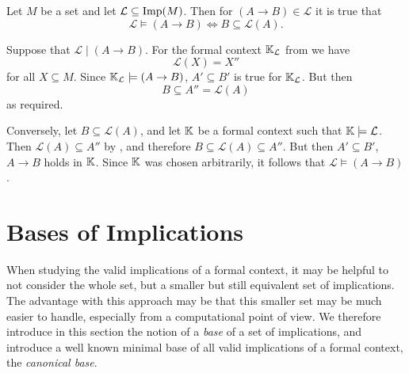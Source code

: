 \begin{Lemma}
  \label{lem:characterization-of-entailment-in-terms-of-induced-closure-operators}
  Let $M$ be a set and let $\mathcal{L} \subseteq \operatorname{Imp}(M)$.  Then for $(A \to B) \in
  \mathcal{L}$ it is true that
  \begin{equation}
    \label{eq:7}
    \mathcal{L} \models (A \to B) \iff B \subseteq \mathcal{L}(A).
  \end{equation}
\end{Lemma}
\begin{Proof}
  Suppose that $\mathcal{L} \mid (A \to B)$.  For the formal context ${\mathbb{K}}_{\mathcal{L}}$ from  we have
  \begin{equation*}
    \mathcal{L}(X) = X''
  \end{equation*}
  for all $X \subseteq M$.  Since ${\mathbb{K}}_{\mathcal{L}} \models (A \to B)$, $A' \subseteq
  B'$ is true for ${\mathbb{K}}_{\mathcal{L}}$.  But then
  \begin{equation*}
    B \subseteq A'' = \mathcal{L}(A)
  \end{equation*}
  as required.

  Conversely, let $B \subseteq \mathcal{L}(A)$, and let ${\mathbb{K}}$ be a formal context such
  that ${\mathbb{K}} \models \mathcal{L}$.  Then $\mathcal{L}(A) \subseteq A''$ by
  , and therefore $B
  \subseteq \mathcal{L}(A) \subseteq A''$.  But then $A' \subseteq B'$, \ie $A \to B$
  holds in ${\mathbb{K}}$.  Since ${\mathbb{K}}$ was chosen arbitrarily, it follows that $\mathcal{L}
  \models (A \to B)$.  
\end{Proof}


\section{Bases of Implications}
\label{sec:bases-implications}

When studying the valid implications of a formal context, it may be helpful to not
consider the whole set, but a smaller but still equivalent set of implications.  The
advantage with this approach may be that this smaller set may be much easier to handle,
especially from a computational point of view.  We therefore introduce in this section the
notion of a \emph{base} of a set of implications, and introduce a well known minimal base
of all valid implications of a formal context, the \emph{canonical base}.

